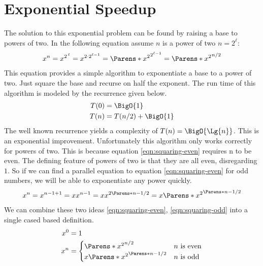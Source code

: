 \documentclass[./Thesis.tex]{subfiles}
\begin{document}
\section{Exponential Speedup}
\label{sec:exponential-speedup}
The solution to this exponential problem can be found by raising a base to
powers of two. In the following equation assume $n$ is a power of two $n = 2^\ell$:
\begin{align}
  \label{eqn:squaring-even}
  x^n = x^{2^{\, \ell}}
  {}  = x^{2 \cdot 2^{\ell - 1}}
  {}  = \Parens*{x^2}^{2^{\ell - 1}}
  {}  = \Parens*{x^2}^{n / 2}
\end{align}
This equation provides a simple algorithm to exponentiate a base to a power of
two. Just square the base and recurse on half the exponent. The run time of this
algorithm is modeled by the recurrence given below.
\begin{align}
  \label{eqn:power-of-two-recurrance}
  \begin{split}
    T(0) &= \BigO{1} \\
    T(n) &= T(n / 2) + \BigO{1}
  \end{split}
\end{align}
The well known recurrence yields a complexity of $T(n) = \BigO{\Lg{n}}$. This is an
exponential improvement. Unfortunately this algorithm only works correctly for
powers of two. This is because equation \ref{eqn:squaring-even} requires n to be
even. The defining feature of powers of two is that they are all even,
disregarding $1$. So if we can find a parallel equation to equation
\ref{eqn:squaring-even} for odd numbers, we will be able to exponentiate any power
quickly.
\begin{align}
  \label{eqn:squaring-odd}
  x^n = x^{n - 1 + 1} = x x^{n - 1} = x x^{2\Parens*{n - 1} / 2} = x \Parens*{x^2}^{\Parens*{n - 1} / 2}
\end{align}
We can combine these two ideas \ref{eqn:squaring-even}, \ref{eqn:squaring-odd}
into a single cased based definition.
\begin{align}
  \label{eqn:squaring-def-division}
  \begin{split}
    x^0 &= 1 \\
    x^n &=
    \begin{cases}
      \Parens*{x^2}^{n / 2} & n \text{ is even} \\
      x \Parens*{x^2}^{\Parens*{n - 1} / 2} & n \text{ is odd}
    \end{cases}
  \end{split}
\end{align}
\end{document}
